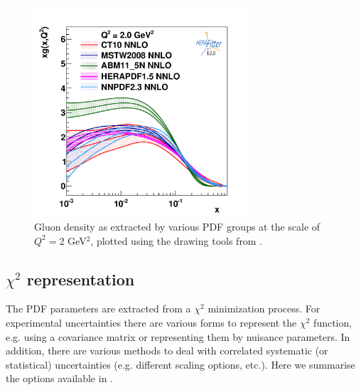 %
\begin{figure}[!ht]
   \centering
   \includegraphics[width=8cm]{pdfs.pdf}
   \caption{Gluon density as extracted by various PDF groups at the scale of $Q^2=2$ GeV$^2$, plotted using the drawing tools from \fitter.} 
 \label{fig:pdfs}
\end{figure}
%
\subsection{$\chi^2$ representation}
\label{sec:chi2representation}

The PDF parameters are extracted from a $\chi^2$ minimization process. 
For experimental uncertainties there are various forms to represent the $\chi^2$ function, e.g. using a covariance matrix or representing them by nuisance parameters. 
In addition, there are various methods to deal with correlated systematic (or statistical) uncertainties (e.g. different scaling options, etc.). Here we summarise the options available in \fitter. 

